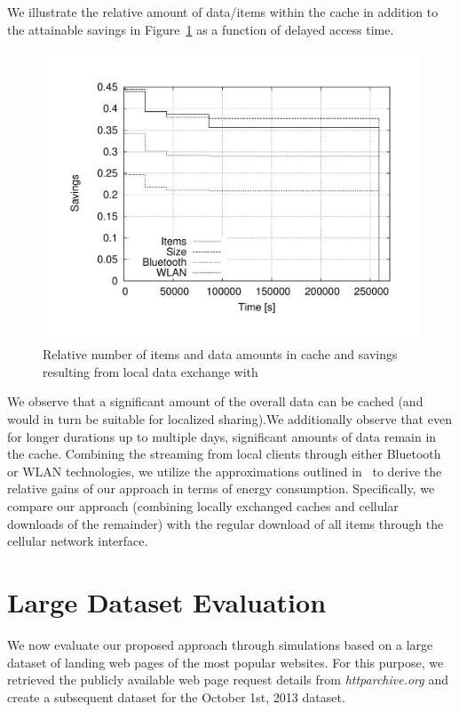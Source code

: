 \documentclass[letterpaper,conference]{IEEEtran}
\begin{document}
We illustrate the relative amount of data/items within the cache in addition to the attainable savings in Figure~\ref{fig:rel_ios_time} as a function of delayed access time. 
\begin{figure}
	\centering
	\includegraphics[width=.95\linewidth]{rel_ios_time}
	\caption{Relative number of items and data amounts in cache and savings resulting from local data exchange with }
	\label{fig:rel_ios_time}
\end{figure}
We observe that a significant amount of the overall data can be cached (and would in turn be suitable for localized sharing).We additionally observe that even for longer durations up to multiple days, significant amounts of data remain in the cache.
Combining the streaming from local clients through either Bluetooth or WLAN technologies, we utilize the approximations outlined in~\cite{} to derive the relative gains of our approach in terms of energy consumption. 
Specifically, we compare our approach (combining locally exchanged caches and cellular downloads of the remainder) with the regular download of all items through the cellular network interface. 


\section{Large Dataset Evaluation}
\label{s:large}
We now evaluate our proposed approach through simulations based on a large dataset of landing web pages of the most popular websites.
For this purpose, we retrieved the publicly available web page request details from \emph{httparchive.org} and create a subsequent dataset for the October 1st, 2013 dataset.
\end{document}

